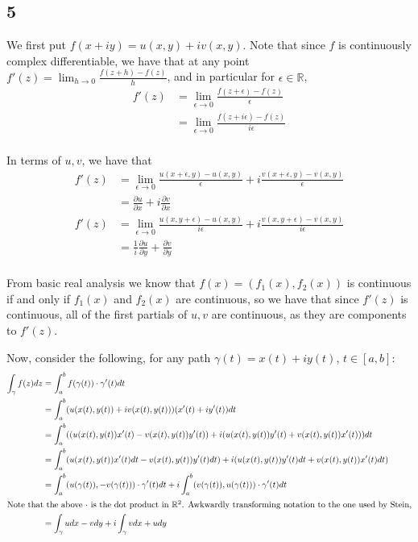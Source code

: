 \documentclass[12pt,letterpaper]{article}
\theoremstyle{definition}
\newcommand{\R}{\mathbb{R}}
\begin{document}
\subsection*{5}

We first put $f(x + iy) = u(x,y) + iv(x,y)$. Note that since $f$ is continuously complex differentiable, we have that at any point $f'(z) = \lim_{h\rightarrow 0}\frac{f(z+h)-f(z)}{h}$, and in particular for $\epsilon \in \R$,
\begin{align*}
  f'(z) &= \lim_{\epsilon\rightarrow 0}\frac{f(z+\epsilon)-f(z)}{\epsilon} \\
        &= \lim_{\epsilon\rightarrow 0}\frac{f(z+i\epsilon)-f(z)}{i\epsilon} \\
\end{align*}

In terms of $u,v$, we have that
\begin{align*}
  f'(z) &= \lim_{\epsilon \rightarrow 0}\frac{u(x+\epsilon,y) -
          u(x,y)}{\epsilon} + i\frac{v(x + \epsilon,y) - v(x,y)}{\epsilon} \\
        &= \frac{\partial u}{\partial x} + i\frac{\partial v}{\partial x} \\
  f'(z) &= \lim_{\epsilon \rightarrow 0}\frac{u(x,y+\epsilon) -
          u(x,y)}{i\epsilon} + i\frac{v(x,y + \epsilon) - v(x,y)}{i\epsilon} \\
        &= \frac{1}{i}\frac{\partial u}{\partial y} + \frac{\partial v}{\partial y} \\
\end{align*}

From basic real analysis we know that $f(x) = (f_{1}(x), f_{2}(x))$ is continuous if and only if $f_{1}(x)$ and $f_{2}(x)$ are continuous, so we have that since $f'(z)$ is continuous, all of the first partials of $u, v$ are continuous, as they are components to $f'(z)$.

Now, consider the following, for any path $\gamma(t) = x(t) + iy(t)$, $t \in [a,b]$:
\begin{align*}
  \int_{\gamma}f(z)dz &= \int_{a}^{b}f(\gamma(t))\cdot\gamma'(t)dt \\
                      &= \int_{a}^{b}(u(x(t), y(t)) + iv(x(t), y(t)))(x'(t) + iy'(t))dt \\
                      &= \int_{a}^{b}((u(x(t), y(t))x'(t) - v(x(t),y(t))y'(t)) + i(u(x(t), y(t))y'(t) + v(x(t),y(t))x'(t)))dt \\
                      &= \int_{a}^{b}(u(x(t), y(t))x'(t)dt - v(x(t),y(t))y'(t)dt) + i(u(x(t), y(t))y'(t)dt + v(x(t),y(t))x'(t)dt)\\
                      &= \int_{a}^{b}(u(\gamma(t)), -v(\gamma(t))) \cdot \gamma'(t)dt + i\int_{a}^{b}(v(\gamma(t)),u(\gamma(t))) \cdot \gamma'(t)dt \\
  \intertext{Note that the above $\cdot$ is the dot product in $\R^{2}$. Awkwardly transforming notation to the one used by Stein,}
                      &= \int_{\gamma} udx - vdy + i\int_{\gamma} vdx + udy\\
\end{align*}
\end{document}
